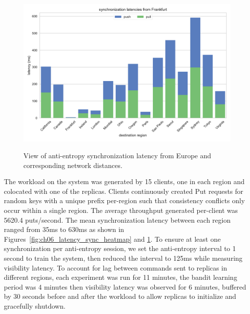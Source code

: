 \begin{figure}
    \begin{center}
        \includegraphics[width=5in]{figures/ch06_push_pull_frankfurt_latencies.pdf}
    \end{center}
    \renewcommand{\baselinestretch}{1}
    \small\normalsize

    \begin{quote}
        \caption[Anti-Entropy Synchronization Latency from Frankfurt]{View of anti-entropy synchronization latency from Europe and corresponding network distances.}
        \label{fig:ch06_push_pull_frankfurt_latencies}
    \end{quote}
\end{figure}
\renewcommand{\baselinestretch}{2}
\small\normalsize

The workload on the system was generated by 15 clients, one in each region and
colocated with one of the replicas.
Clients continuously created Put requests for random keys with a unique
prefix per-region such that consistency conflicts only occur within a
single region.
The average throughput generated per-client was 5620.4 puts/second.
The mean synchronization latency between each region ranged from 35ms to
630ms as shown in Figures~\ref{fig:ch06_latency_sync_heatmap} and \ref{fig:ch06_push_pull_frankfurt_latencies}.
To ensure at least one synchronization per anti-entropy session, we set the
anti-entropy interval to 1 second to train the system, then reduced the
interval to 125ms while measuring visibility latency.
To account for lag between commands sent to replicas in different regions,
each experiment was run for 11 minutes, the bandit learning period was 4
minutes then visibility latency was observed for 6 minutes, buffered by 30
seconds before and after the workload to allow replicas to initialize and
gracefully shutdown.


